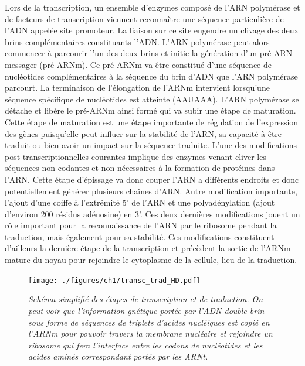 

Lors de la transcription, un ensemble d'enzymes composé de l'ARN polymérase et de facteurs de transcription viennent reconnaître une séquence particulière de l'ADN appelée site promoteur. La liaison sur ce site engendre un clivage des deux brins complémentaires constituants l'ADN. L'ARN polymérase peut alors commencer à parcourir l'un des deux brins et initie la génération d'un pré-ARN messager (pré-ARNm). Ce pré-ARNm va être constitué d'une séquence de nucléotides complémentaires à la séquence du brin d'ADN que l'ARN polymérase parcourt. La terminaison de l'élongation de l'ARNm intervient lorsqu’une séquence spécifique de nucléotides est atteinte (AAUAAA). L'ARN polymérase se détache et libère le pré-ARNm ainsi formé qui va subir une étape de maturation. Cette étape de maturation est une étape importante de régulation de l'expression des gènes puisqu'elle peut influer sur la stabilité de l'ARN, sa capacité à être traduit ou bien avoir un impact sur la séquence traduite. L'une des modifications post-transcriptionnelles courantes implique des enzymes venant cliver les séquences non codantes et non nécessaires à la formation de protéines dans l'ARN. Cette étape d'épissage va donc couper l'ARN a différents endroits et donc potentiellement générer plusieurs chaînes d'ARN. Autre modification importante, l'ajout d'une coiffe à l'extrémité 5' de l'ARN et une polyadénylation (ajout d'environ 200 résidus adénosine) en 3'. Ces deux dernières modifications jouent un rôle important pour la reconnaissance de l'ARN par le ribosome pendant la traduction, mais également pour sa stabilité. Ces modifications constituent d'ailleurs la dernière étape de la transcription et précèdent la sortie de l'ARNm mature du noyau pour rejoindre le cytoplasme de la cellule, lieu de la traduction.

\begin{figure}
  \centering
  {\texttt{[image: ./figures/ch1/transc\_trad\_HD.pdf]}}
    \caption{\it Schéma simplifié des étapes de transcription et de traduction. On peut voir que l'information gnétique portée par l'ADN double-brin sous forme de séquences de triplets d'acides nucléiques est copié en l'ARNm pour pouvoir travers la membrane nucléaire et rejoindre un ribosome qui fera l'interface entre les codons de nucléotides et les acides aminés correspondant portés par les ARNt.}
    \label{Fig:transc_trad_HD}
  \hspace{0.2cm}
\end{figure}



